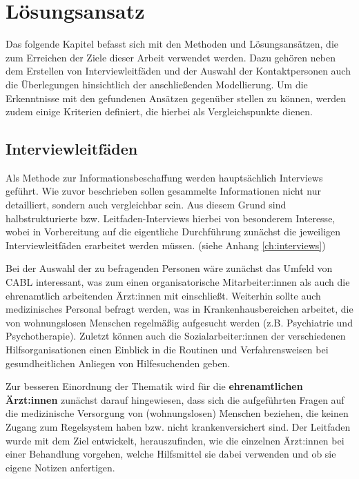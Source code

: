 \chapter{Lösungsansatz}\label{ch:approach}

Das folgende Kapitel befasst sich mit den Methoden und Lösungsansätzen, die zum Erreichen der Ziele dieser Arbeit verwendet werden. Dazu gehören neben dem Erstellen von Interviewleitfäden und der Auswahl der Kontaktpersonen auch die Überlegungen hinsichtlich der anschließenden Modellierung. Um die Erkenntnisse mit den gefundenen Ansätzen gegenüber stellen zu können, werden zudem einige Kriterien definiert, die hierbei als Vergleichspunkte dienen.


\section{Interviewleitfäden}\label{sec:guidelines}

Als Methode zur Informationsbeschaffung werden hauptsächlich Interviews geführt. Wie zuvor beschrieben sollen gesammelte Informationen nicht nur detailliert, sondern auch vergleichbar sein. Aus diesem Grund sind halbstrukturierte bzw. Leitfaden-Interviews hierbei von besonderem Interesse, wobei in Vorbereitung auf die eigentliche Durchführung zunächst die jeweiligen Interviewleitfäden erarbeitet werden müssen. (siehe Anhang \ref{ch:interviews})

Bei der Auswahl der zu befragenden Personen wäre zunächst das Umfeld von \ac{CABL} interessant, was zum einen organisatorische Mitarbeiter:innen als auch die ehrenamtlich arbeitenden Ärzt:innen mit einschließt. Weiterhin sollte auch medizinisches Personal befragt werden, was in Krankenhausbereichen arbeitet, die von wohnungslosen Menschen regelmäßig aufgesucht werden (z.B. Psychiatrie und Psychotherapie). Zuletzt können auch die Sozialarbeiter:innen der verschiedenen Hilfsorganisationen einen Einblick in die Routinen und Verfahrensweisen bei gesundheitlichen Anliegen von Hilfesuchenden geben.

Zur besseren Einordnung der Thematik wird für die \textbf{ehrenamtlichen Ärzt:innen} zunächst darauf hingewiesen, dass sich die aufgeführten Fragen auf die medizinische Versorgung von (wohnungslosen) Menschen beziehen, die keinen Zugang zum Regelsystem haben bzw. nicht krankenversichert sind. Der Leitfaden wurde mit dem Ziel entwickelt, herauszufinden, wie die einzelnen Ärzt:innen bei einer Behandlung vorgehen, welche Hilfsmittel sie dabei verwenden und ob sie eigene Notizen anfertigen.


